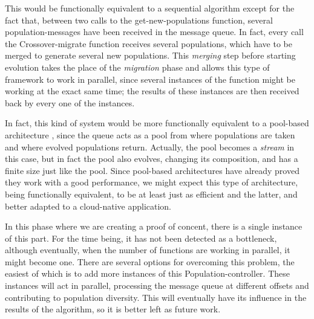 \documentclass[sigconf]{acmart}
\begin{document}

This would be functionally equivalent to a sequential algorithm except
for the fact that, between two calls to the {\sf get-new-populations}
function, several 
population-messages have been received in the message queue. In fact,
every call the {\sf Crossover-migrate} function receives several populations, which
have to be merged to generate several new populations. This {\em merging} step
before starting evolution takes the place of the {\em migration} phase
and allows this type of framework to work in parallel, since several
instances of the function might be working at the exact same time; the
results of these instances are then received back by every one of the
instances.

In fact, this kind of system would be more functionally equivalent to
a pool-based architecture \cite{bollini1999distributed}, since the
queue acts as a pool from where populations are taken and where
evolved populations return. Actually, the pool becomes a {\em stream}
in this case, but in fact the pool also evolves, changing its
composition, and has a finite size just like the pool. Since
pool-based architectures have already proved they work with a good
performance, we might expect this type of architecture, being
functionally equivalent, to be at least just as efficient and the
latter, and better adapted to a cloud-native application.

In this phase where we are creating a proof of concent, there is a
single instance of this part. For the time being, it has not been
detected as a bottleneck, although eventually, when the number of
functions are working in parallel, it might become one. There are
several options for overcoming this problem, the easiest of which is
to add more instances of this {\sf Population-controller}. These
instances will act in parallel, processing the message queue at
different offsets and contributing to population diversity. This will
eventually have its influence in the results of the algorithm, so it
is better left as future work. 
\end{document}
